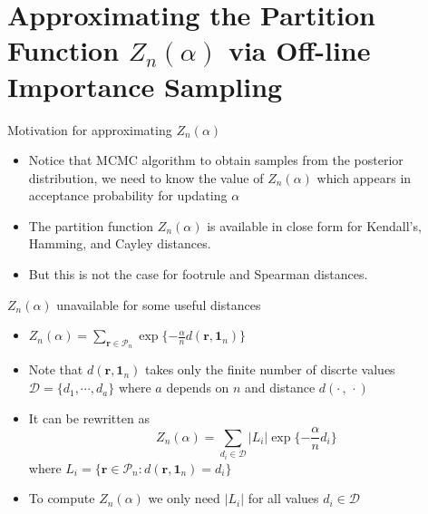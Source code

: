 \documentclass[11pt]{beamer}
\begin{document}
\section{Approximating the Partition Function $Z_n(\alpha)$ via Off-line Importance Sampling}
\begin{frame}{Motivation for approximating $Z_n(\alpha)$}
\begin{itemize}
    \item Notice that MCMC algorithm to obtain samples from the posterior distribution, we need to know the value of $Z_n(\alpha)$ which appears in acceptance probability for updating $\alpha$
    \item The partition function $Z_n(\alpha)$ is available in close form for Kendall's, Hamming, and Cayley distances.
    \item But this is not the case for footrule and Spearman distances.
\end{itemize}
\end{frame}

\begin{frame}{$Z_n(\alpha)$ unavailable for some useful distances}
\begin{itemize}
    \item $Z_n(\alpha)=\sum_{\mathbf{r}\in \mathcal{P}_n}\exp\{-\frac{\alpha}{n}d(\mathbf{r},\mathbf{1}_n)\}$
    \item Note that $d(\mathbf{r}, \mathbf{1}_n)$ takes only the finite number of discrte values $\mathcal{D}=\{d_1, \cdots , d_a\}$ where $a$ depends on $n$ and distance $d(\cdot\,,\,\cdot)$
    \item It can be rewritten as $$Z_n(\alpha)=\sum_{d_i\in \mathcal{D}}|L_i|\exp\{-\frac{\alpha}{n}d_i\} $$ where $L_i=\{\mathbf{r}\in \mathcal{P}_n : d(\mathbf{r}, \mathbf{1}_n)=d_i\}$
    \item To compute $Z_n(\alpha)$ we only need $|L_i|$ for all values $d_i\in \mathcal{D}$
\end{itemize}
\end{frame}
\end{document}
